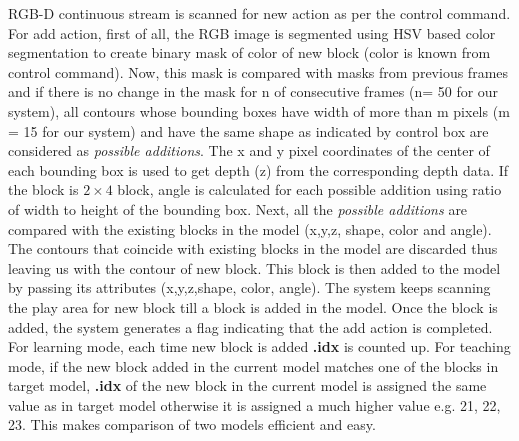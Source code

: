 RGB-D continuous stream is scanned for new action as per the control command. For  add action, first of all, the RGB image is segmented using HSV based color segmentation to create binary mask of color of new block (color is known from control command). Now, this mask is compared with masks from previous frames and if there is no change in the mask for n of consecutive frames (n= 50 for our system), all contours whose bounding boxes have width of more than m pixels (m = 15 for our system) and have the same shape as indicated by control box are considered as \emph{possible additions}. The x and y pixel coordinates of the center of each bounding box is used to get depth (z) from the corresponding depth data. If the block is $2 \times 4$ block, angle is calculated for each possible addition using ratio of width to height of the bounding box. Next, all the \emph{possible additions} are compared with the existing blocks in the model (x,y,z, shape, color and angle). The contours that coincide with existing blocks in the model are discarded thus leaving us with the contour of new block. This block is then added to the model by passing its attributes (x,y,z,shape, color, angle). The system keeps scanning the play area for new block till a block is added in the model. Once the block is added, the system generates a flag indicating that the add action is completed. For learning mode, each time new block is added \textbf{.idx} is counted up. For teaching mode, if the new block added in the current model matches one of the blocks in target model, \textbf{.idx} of the new block in the current model is assigned the same value as in target model otherwise it is assigned a much higher value e.g. 21, 22, 23. This makes comparison of two models efficient and easy. \\
